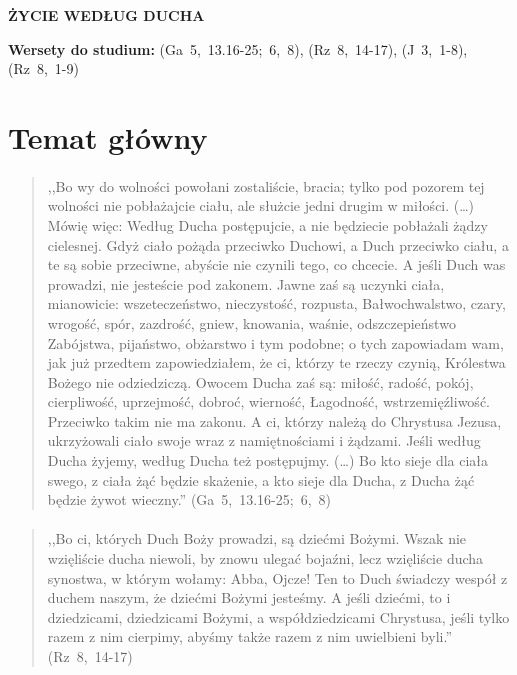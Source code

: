 \documentclass[10pt,a4paper,oneside]{article}
\begin{document}
\centerline{\textbf{\MakeUppercase{Życie według Ducha}}}
\begin{center}
\textbf{Wersety do studium:} \mbox{(Ga 5, 13.16-25; 6, 8)}, \mbox{(Rz 8, 14-17)}, \mbox{(J 3, 1-8)}, \mbox{(Rz 8, 1-9)}
\end{center}
\section{Temat główny}
\paragraph{}
\begin{quote}
,,Bo wy do wolności powołani zostaliście, bracia; tylko pod pozorem tej wolności nie pobłażajcie ciału, ale służcie jedni drugim w miłości. (\ldots) Mówię więc: Według Ducha postępujcie, a nie będziecie pobłażali żądzy cielesnej. Gdyż ciało pożąda przeciwko Duchowi, a Duch przeciwko ciału, a te są sobie przeciwne, abyście nie czynili tego, co chcecie. A jeśli Duch was prowadzi, nie jesteście pod zakonem. Jawne zaś są uczynki ciała, mianowicie: wszeteczeństwo, nieczystość, rozpusta, Bałwochwalstwo, czary, wrogość, spór, zazdrość, gniew, knowania, waśnie, odszczepieństwo Zabójstwa, pijaństwo, obżarstwo i tym podobne; o tych zapowiadam wam, jak już przedtem zapowiedziałem, że ci, którzy te rzeczy czynią, Królestwa Bożego nie odziedziczą. Owocem Ducha zaś są: miłość, radość, pokój, cierpliwość, uprzejmość, dobroć, wierność, Łagodność, wstrzemięźliwość. Przeciwko takim nie ma zakonu. A ci, którzy należą do Chrystusa Jezusa, ukrzyżowali ciało swoje wraz z namiętnościami i żądzami. Jeśli według Ducha żyjemy, według Ducha też postępujmy. (\ldots) Bo kto sieje dla ciała swego, z ciała żąć będzie skażenie, a kto sieje dla Ducha, z Ducha żąć będzie żywot wieczny.'' \mbox{(Ga 5, 13.16-25; 6, 8)}
\end{quote}
\paragraph{}
\begin{quote}
,,Bo ci, których Duch Boży prowadzi, są dziećmi Bożymi. Wszak nie wzięliście ducha niewoli, by znowu ulegać bojaźni, lecz wzięliście ducha synostwa, w którym wołamy: Abba, Ojcze! Ten to Duch świadczy wespół z duchem naszym, że dziećmi Bożymi jesteśmy. A jeśli dziećmi, to i dziedzicami, dziedzicami Bożymi, a współdziedzicami Chrystusa, jeśli tylko razem z nim cierpimy, abyśmy także razem z nim uwielbieni byli.'' \mbox{(Rz 8, 14-17)}
\end{quote}
\end{document}
